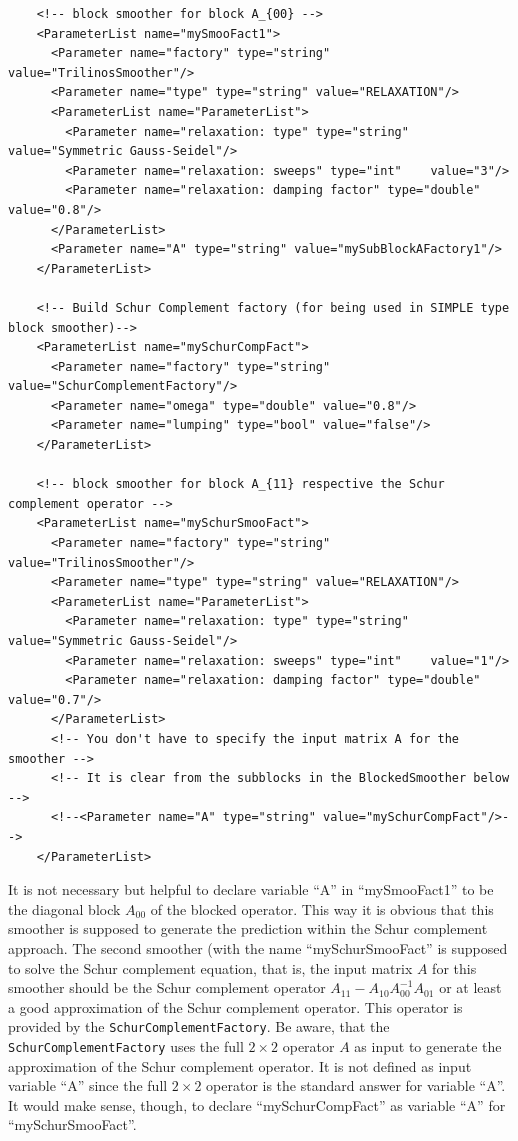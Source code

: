 \documentclass[10pt,fleqn]{book}
\begin{document}
\begin{lstlisting}
    <!-- block smoother for block A_{00} -->
    <ParameterList name="mySmooFact1">
      <Parameter name="factory" type="string" value="TrilinosSmoother"/>
      <Parameter name="type" type="string" value="RELAXATION"/>
      <ParameterList name="ParameterList">
        <Parameter name="relaxation: type" type="string" value="Symmetric Gauss-Seidel"/>
        <Parameter name="relaxation: sweeps" type="int"    value="3"/>
        <Parameter name="relaxation: damping factor" type="double" value="0.8"/>
      </ParameterList>
      <Parameter name="A" type="string" value="mySubBlockAFactory1"/>
    </ParameterList>

    <!-- Build Schur Complement factory (for being used in SIMPLE type block smoother)-->
    <ParameterList name="mySchurCompFact">
      <Parameter name="factory" type="string" value="SchurComplementFactory"/>
      <Parameter name="omega" type="double" value="0.8"/>
      <Parameter name="lumping" type="bool" value="false"/>
    </ParameterList>

    <!-- block smoother for block A_{11} respective the Schur complement operator -->
    <ParameterList name="mySchurSmooFact">
      <Parameter name="factory" type="string" value="TrilinosSmoother"/>
      <Parameter name="type" type="string" value="RELAXATION"/>
      <ParameterList name="ParameterList">
        <Parameter name="relaxation: type" type="string" value="Symmetric Gauss-Seidel"/>
        <Parameter name="relaxation: sweeps" type="int"    value="1"/>
        <Parameter name="relaxation: damping factor" type="double" value="0.7"/>
      </ParameterList>
      <!-- You don't have to specify the input matrix A for the smoother -->
      <!-- It is clear from the subblocks in the BlockedSmoother below -->
      <!--<Parameter name="A" type="string" value="mySchurCompFact"/>-->
    </ParameterList>
\end{lstlisting}

It is not necessary but helpful to declare variable ``A'' in ``mySmooFact1'' to be the diagonal block $A_{00}$ of the blocked operator. This way it is obvious that this smoother is supposed to generate the prediction within the Schur complement approach. The second smoother (with the name ``mySchurSmooFact'' is supposed to solve the Schur complement equation, that is, the input matrix $A$ for this smoother should be the Schur complement operator $A_{11}-A_{10}A_{00}^{-1}A_{01}$ or at least a good approximation of the Schur complement operator. This operator is provided by the \texttt{SchurComplementFactory}. Be aware, that the \texttt{SchurComplementFactory} uses the full $2\times 2$ operator $A$ as input to generate the approximation of the Schur complement operator. It is not defined as input variable ``A'' since the full $2\times 2$ operator is the standard answer for variable ``A''. It would make sense, though, to declare ``mySchurCompFact'' as variable ``A'' for ``mySchurSmooFact''.
\end{document}
